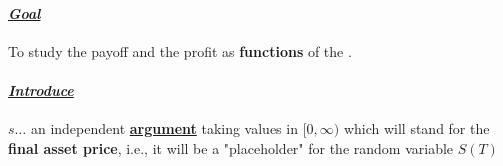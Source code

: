 \documentclass[reqno,letterpaper, onsided,10pt]{amsart}
\newcommand{\sol}[1]{\par\noindent{\bf Solution:} #1}
\renewcommand{\sol}[1]{\newpage}
\begin{document}
\sol{
  The initial cost is $S(0)$ and the payoff is $S(T)$ with $T=1$. So, the profit equals 
  \begin{equation} %
  \nonumber
   \begin{split}
      S(T) - S(0) e^{rT}.  
   \end{split}
  \end{equation}
  Thus, the expected profit equals 
  \begin{equation} %
  \nonumber
   \begin{split}
     \EE[S(T)] - S(0) e^{rT}.  
   \end{split}
  \end{equation}
According to the given model for the stock price, we have 
\begin{equation} %
\nonumber
 \begin{split}
   \EE[S(T)] = 45\left(\frac{1}{4}\right)  +  42\left(\frac{1}{2}\right) +  38 \left(\frac{1}{4}\right) = 41.75.   
 \end{split}
\end{equation}
Finally, the expected profit is 
\begin{equation} %
\nonumber
 \begin{split}
   41.75 - 40 e^{0.04} = 0.117569.   
 \end{split}
\end{equation}
}

\newpage

\paragraph{{\color{huntergreen} \underline{\it Goal}}} 
To study the payoff and the profit as {\color{maroon} {\bf functions}} 
of the {\color{maroon}{\bf final asset price}}. 

\paragraph{{\color{huntergreen} \underline{\it Introduce}}}
{\color{maroon} $s \dots$ an independent \underline{\bf argument} 
taking values in $[0, \infty)$ which will stand for the 
{\color{maroon} \bf final asset price}, i.e., it will be a "placeholder" 
for the random variable $S(T)$
}

\medskip

\newpage
\end{document}

